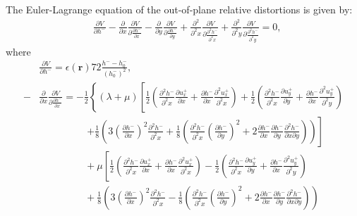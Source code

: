 \documentclass[aps,prx,10pt,twocolumn,superscriptaddress]{revtex4}
\begin{document}
\begin{widetext}
The Euler-Lagrange equation of the out-of-plane relative distortions is given by: 
\begin{align}
&\frac{\partial V}{\partial h^{-}}-\frac{\partial}{\partial x}\frac{\partial V}{\partial \frac{\partial h^{-}}{\partial x}}-\frac{\partial}{\partial y}\frac{\partial V}{\partial \frac{\partial h^{-}}{\partial y}}+\frac{\partial^{2}}{\partial^{2} x}\frac{\partial V}{\partial \frac{\partial^{2} h^{-}}{\partial^{2} x}}+\frac{\partial^{2}}{\partial^{2} y}\frac{\partial V}{\partial \frac{\partial^{2} h^{-}}{\partial^{2} y}}=0,
\end{align}
where
\allowdisplaybreaks
\begin{align}
&\frac{\partial V}{\partial h^{-}}=\epsilon(\textbf{r})72\frac{h^{-}-h^{-}_{0}}{\left(h^{-}_{0}\right)^{2}},\nonumber\\
-&\frac{\partial}{\partial x}\frac{\partial V}{\partial \frac{\partial h^{-}}{\partial x}}=-\frac{1}{2}\left\{(\lambda+\mu) \left[ \frac{1}{2}\left( \frac{\partial^{2}h^{-}}{\partial^{2}x}\frac{\partial u^{+}_{x}}{\partial x}+\frac{\partial h^{-}}{\partial x}\frac{\partial^{2}u^{+}_{x}}{\partial^{2}x} \right)+\frac{1}{2}\left( \frac{\partial^{2}h^{-}}{\partial^{2}x}\frac{\partial u^{+}_{y}}{\partial y}+\frac{\partial h^{-}}{\partial x}\frac{\partial^{2}u^{+}_{y}}{\partial^{2}y} \right) \right. \right.\nonumber\\
&\ \ \ \ \ \ \ \ \ \ \ \ \ \ \ \ \ \ \ \ \ \ \left.+\frac{1}{8}\left(3\left(\frac{\partial h^{-}}{\partial x}\right)^{2}\frac{\partial^{2}h^{-}}{\partial^{2}x}+\frac{1}{8}\left(\frac{\partial^{2}h^{-}}{\partial^{2}x}\left(\frac{\partial h^{-}}{\partial y}\right)^{2}+2\frac{\partial h^{-}}{\partial x}\frac{\partial h^{-}}{\partial y}\frac{\partial^{2} h^{-}}{\partial x\partial y}\right)\right)\right]\nonumber\\
&\ \ \ \ \ \ \ \ \ \ \ \ \ \ \ \ \ \ \ \ \ +\mu\left[ \frac{1}{2}\left(  \frac{\partial^{2}h^{-}}{\partial^{2}x}\frac{\partial u^{+}_{x}}{\partial x}+\frac{\partial h^{-}}{\partial x}\frac{\partial^{2}u^{+}_{x}}{\partial^{2}x} \right) - \frac{1}{2}\left( \frac{\partial^{2}h^{-}}{\partial^{2}x}\frac{\partial u^{+}_{y}}{\partial y}+\frac{\partial h^{-}}{\partial x}\frac{\partial^{2}u^{+}_{y}}{\partial^{2}y} \right) \right.\nonumber\\
&\ \ \ \ \ \ \ \ \ \ \ \ \ \ \ \ \ \ \ \ \ +\frac{1}{8}\left(3\left(\frac{\partial h^{-}}{\partial x}\right)^{2}\frac{\partial^{2}h^{-}}{\partial^{2}x}-\frac{1}{8}\left(\frac{\partial^{2}h^{-}}{\partial^{2}x}\left(\frac{\partial h^{-}}{\partial y}\right)^{2}+2\frac{\partial h^{-}}{\partial x}\frac{\partial h^{-}}{\partial y}\frac{\partial^{2} h^{-}}{\partial x\partial y}\right)\right)\nonumber\\

\end{align}
\end{widetext}
\end{document}
